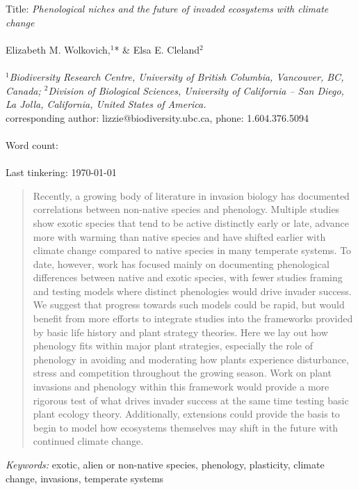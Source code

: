 \documentclass[11pt,a4paper,oneside]{article}
\begin{document}


\noindent Title: \emph{Phenological niches and the future of invaded ecosystems with climate change}\\
\\
\noindent Elizabeth M. Wolkovich,$^{1}$* \& Elsa E. Cleland$^{2}$ \\
\\
\noindent \emph{$^{1}$Biodiversity Research Centre, University of British Columbia, Vancouver, BC, Canada; $^{2}$Division of Biological Sciences, University of
  California -- San Diego, La Jolla, California, United States of America.}\\
\noindent *corresponding author: lizzie@biodiversity.ubc.ca, phone: 1.604.376.5094\\
\\
\noindent Word count: \\
\\
\noindent Last tinkering: \today 
\\
\begin{abstract} Recently, a growing body of literature in invasion biology has documented correlations between non-native species and phenology. Multiple studies show exotic species that tend to be active distinctly early or late, advance more with warming than native species and have shifted earlier with climate change compared to native species in many temperate systems. To date, however, work has focused mainly on documenting phenological differences between native and exotic species, with fewer studies framing and testing models where distinct phenologies would drive invader success. We suggest that progress towards such models could be rapid, but would benefit from more efforts to integrate studies into the frameworks provided by basic life history and plant strategy theories. Here we lay out how phenology fits within major plant strategies, especially the role of phenology in avoiding and moderating how plants experience disturbance, stress and competition throughout the growing season. Work on plant invasions and phenology within this framework would provide a more rigorous test of what drives invader success at the same time testing basic plant ecology theory. Additionally, extensions could provide the basis to begin to model how ecosystems themselves may shift in the future with continued climate change. 
\end{abstract}


\noindent \emph{Keywords:} exotic, alien or non-native species, phenology, plasticity, climate change, invasions, temperate systems
\end{document}

